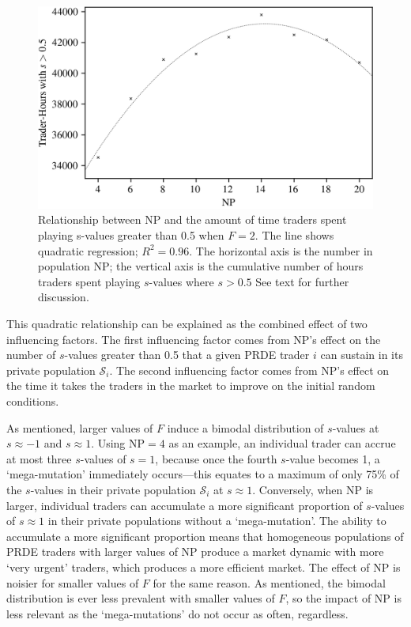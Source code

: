 \documentclass[a4paper,twoside]{article}
\begin{document}
\begin{figure}[htbp]
    \centerline{\includegraphics[width=\columnwidth]{f=2.0_strats.png}}
    \caption{
        Relationship between $\mathrm{NP}$ and the amount of time traders spent playing s-values greater than 0.5 when $F=2$.
        The line shows quadratic regression; $R^2=0.96$.
        The horizontal axis is the number in population $\mathrm{NP}$; the vertical axis is the cumulative number of hours traders spent playing $s$-values where $s>0.5$
        See text for further discussion.
    }
    \label{F=2.0_strats}
\end{figure}

This quadratic relationship can be explained as the combined effect of two influencing factors.
The first influencing factor comes from $\mathrm{NP}$'s effect on the number of $s$-values greater than 0.5 that a given PRDE trader $i$ can sustain in its private population $\mathcal{S}_i$.
The second influencing factor comes from $\mathrm{NP}$'s effect on the time it takes the traders in the market to improve on the initial random conditions.

As mentioned, larger values of $F$ induce a bimodal distribution of $s$-values at $s\approx -1$ and $s\approx 1$.
Using $\mathrm{NP}=\mathrm{4}$ as an example, an individual trader can accrue at most three $s$-values of $s=1$, because once the fourth $s$-value becomes 1, a `mega-mutation' immediately occurs---this equates to a maximum of only 75\% of the $s$-values in their private population $\mathcal{S}_i$ at $s\approx 1$.
Conversely, when $\mathrm{NP}$ is larger, individual traders can accumulate a more significant proportion of $s$-values of $s\approx 1$ in their private populations without a `mega-mutation'.
The ability to accumulate a more significant proportion means that homogeneous populations of PRDE traders with larger values of $\mathrm{NP}$ produce a market dynamic with more `very urgent' traders, which produces a more efficient market.
The effect of $\mathrm{NP}$ is noisier for smaller values of $F$ for the same reason.
As mentioned, the bimodal distribution is ever less prevalent with smaller values of $F$, so the impact of $\mathrm{NP}$ is less relevant as the `mega-mutations' do not occur as often, regardless.
\end{document}
